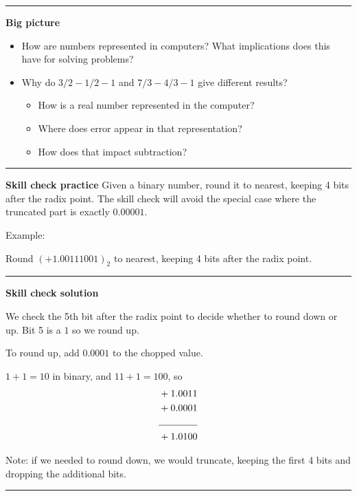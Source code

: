 \documentclass[12pt,letterpaper,noanswers]{exam}
\begin{document}
\hrule
\vspace{0.2cm}


\noindent\textbf{Big picture}
\begin{itemize}
    \itemsep0pt
\item How are numbers represented in computers?  What implications does this have for solving problems?

\item Why do $3/2 - 1/2 - 1$ and $7/3 - 4/3 - 1$ give different results?
\begin{itemize}
    \itemsep0pt
    \item How is a real number represented in the computer?
    \item Where does error appear in that representation?
    \item How does that impact subtraction?
\end{itemize}
\end{itemize}

\vspace{0.2cm}
\hrule
\vspace{0.2cm}

\noindent \textbf{Skill check practice}
Given a binary number, round it to nearest, keeping 4 bits after the radix point.  The skill check will avoid the special case where the truncated part is exactly $0.00001$.

\noindent Example:

Round $(+1.00111001)_2$ to nearest, keeping 4 bits after the radix point. 


\vspace{0.2cm}
\hrule
\vspace{0.2cm}

\noindent \textbf{Skill check solution}

We check the 5th bit after the radix point to decide whether to round down or up.  Bit 5 is a $1$ so we round up.  

To round up, add $0.0001$ to the chopped value.

$1 + 1 = 10$ in binary, and $11 + 1 = 100$, so 
\begin{align*}
    &+1.0011 \\
    &+0.0001 \\
    \cline{1-2}
     &+1.0100
\end{align*}

Note: if we needed to round down, we would truncate, keeping the first 4 bits and dropping the additional bits.

\vspace{0.2cm}
\hrule
\vspace{0.2cm}
\end{document}
